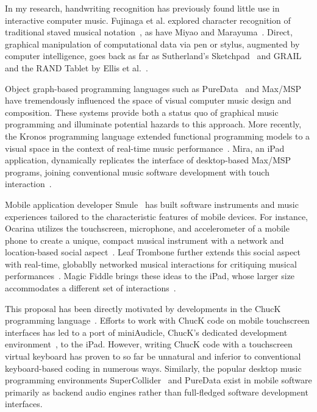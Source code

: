 \documentclass[10pt,letterpaper]{article}
\begin{document}

In my research, handwriting recognition has previously found little use in interactive computer music. 
Fujinaga et al. explored character recognition of traditional staved musical notation~\cite{fujinaga1989computer, fujinaga1996exemplar}, as have Miyao and Marayuma~\cite{miyao2007online}. 
Direct, graphical manipulation of computational data via pen or stylus, augmented by computer intelligence, goes back as far as Sutherland's Sketchpad~\cite{sutherland1964sketch} and GRAIL and the RAND Tablet by Ellis et al.~\cite{davis1964rand}. 

Object graph-based programming languages such as PureData~\cite{puckette1996pure} and Max/MSP~\cite{zicarelli1998extensible} have tremendously influenced the space of visual computer music design and composition. 
These systems provide both a status quo of graphical music programming and illuminate potential hazards to this approach. 
More recently, the Kronos programming language extended functional programming models to a visual space in the context of real-time music performance~\cite{norilo2012visualization}. 
Mira, an iPad application, dynamically replicates the interface of desktop-based Max/MSP programs, joining conventional music software development with touch interaction~\cite{tarakajian2013anmira}. 

Mobile application developer Smule~\cite{wang2009smule} has built software instruments and music experiences tailored to the characteristic features of mobile devices. 
For instance, Ocarina utilizes the touchscreen, microphone, and accelerometer of a mobile phone to create a unique, compact musical instrument with a network and location-based social aspect~\cite{wang2014ocarina}. 
Leaf Trombone further extends this social aspect with real-time, globablly networked musical interactions for critiquing musical performances~\cite{wang2011world}. 
Magic Fiddle brings these ideas to the iPad, whose larger size accommodates a different set of interactions~\cite{wang2011designing}. 

This proposal has been directly motivated by developments in the ChucK programming language~\cite{wang2008chuck}. 
Efforts to work with ChucK code on mobile touchscreen interfaces has led to a port of miniAudicle, ChucK's dedicated development environment~\cite{salazar2006miniaudicle}, to the iPad. 
However, writing ChucK code with a touchscreen virtual keyboard has proven to so far be unnatural and inferior to conventional keyboard-based coding in numerous ways. 
Similarly, the popular desktop music programming environments SuperCollider~\cite{mccartney2002supercollider} and PureData exist in mobile software primarily as backend audio engines rather than full-fledged software development interfaces.   
\end{document}
